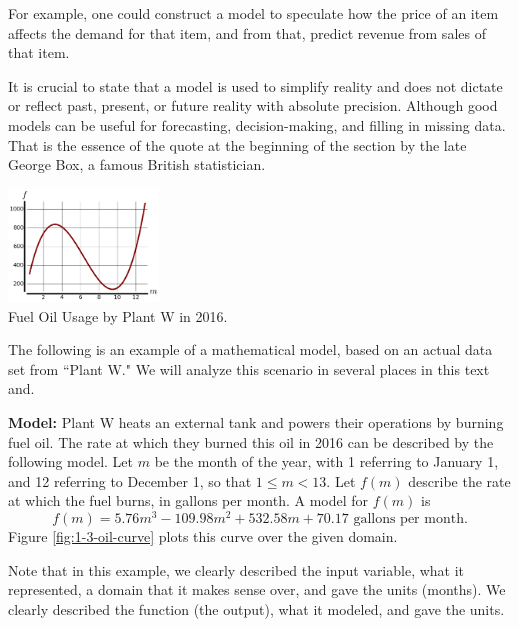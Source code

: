 For example, one could construct a model to speculate how the price of an item affects the demand for that item, and from that, predict revenue from sales of that item.

It is crucial to state that a model is used to simplify reality and does not dictate or reflect past, present, or future reality with absolute precision. Although good models can be useful for forecasting, decision-making, and filling in missing data. That is the essence of the quote at the beginning of the section by the late George Box, a famous British statistician.

\begin{floatingfigure}{0.3\textwidth}
    \centering
    \includegraphics[width=0.3\textwidth]{img/chap1/sec1-3/fig1-3-oil.png}\\
    \caption{Fuel Oil Usage by Plant W in 2016.}
    \label{fig:1-3-oil-curve}
\end{floatingfigure}

The following is an example of a mathematical model, based on an actual data set from ``Plant W." We will analyze this scenario in several places in this text and.

{\bf Model:} Plant W heats an external tank and powers their operations by burning fuel oil. The rate at which they burned this oil in 2016 can be described by the following model. Let $m$ be the month of the year, with 1 referring to January 1, and 12 referring to December 1, so that $1\le m < 13$. Let $f(m)$ describe the rate at which the fuel burns, in gallons per month. A model for $f(m)$ is
$$f(m) = 5.76m^3 - 109.98m^2 + 532.58m + 70.17\mbox{ gallons per month.}$$
Figure \ref{fig:1-3-oil-curve} plots this curve over the given domain.
\begin{remark} Note that in this example, we clearly described the input variable, what it represented, a domain that it makes sense over, and gave the units (months). We clearly described the function (the output), what it modeled, and gave the units.
\end{remark}

